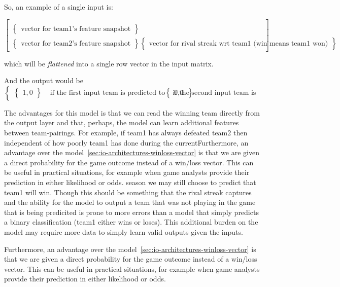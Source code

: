 \documentclass{article} %
\begin{document}
\begin{enumerate}
So, an example of a single input is:

\[
\begin{bmatrix}
  \\
  \begin{Bmatrix}
    \text{vector for team1's feature snapshot}
  \end{Bmatrix}
  \\
  \begin{Bmatrix}
    \text{vector for team2's feature snapshot}
  \end{Bmatrix}
  \begin{Bmatrix}
    \text{vector for rival streak wrt team1 (win means team1 won)}
  \end{Bmatrix}
\end{bmatrix}
\]

which will be \textit{flattened} into a single row vector in the input matrix.

And the output would be
\[
\begin{cases}
  \begin{Bmatrix}
    1, 0
  \end{Bmatrix} & \text{ if the first input team is predicted to win}
  \begin{Bmatrix}
    0, 1
  \end{Bmatrix} & \text{ if the second input team is predicted to win}
\end{cases}
\]


The advantages for this model is that we can read the winning team directly from the output layer and that, perhaps, the model can learn additional features between team-pairings.  For example, if team1 has always defeated team2 then independent of how poorly team1 has done during the currentFurthermore, an advantage over the model~\ref{sec:io-architectures-winloss-vector} is that we are given a direct probability for the game outcome instead of a win/loss vector.  This can be useful in practical situations, for example when game analysts provide their prediction in either likelihood or odds. season we may still choose to predict that team1 will win.  Though this should be something that the rival streak captures and the ability for the model to output a team that was not playing in the game that is being predicited is prone to more errors than a model that simply predicts a binary classification (team1 either wins or loses).  This additional burden on the model may require more data to simply learn valid outputs given the inputs.

Furthermore, an advantage over the model~\ref{sec:io-architectures-winloss-vector} is that we are given a direct probability for the game outcome instead of a win/loss vector.  This can be useful in practical situations, for example when game analysts provide their prediction in either likelihood or odds.



\end{enumerate}
\end{document}
